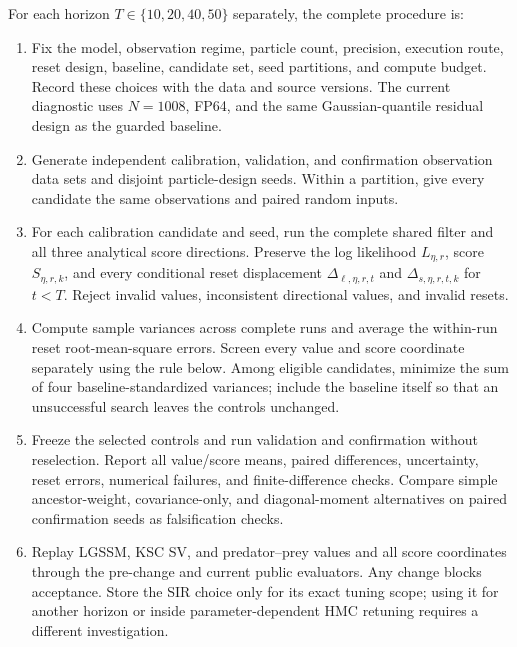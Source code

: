 For each horizon $T\in\{10,20,40,50\}$ separately, the complete procedure is:
\begin{enumerate}
 \item Fix the model, observation regime, particle count, precision, execution
 route, reset design, baseline, candidate set, seed partitions, and compute
 budget.  Record these choices with the data and source versions.  The current
 diagnostic uses $N=1008$, FP64, and the same Gaussian-quantile residual design
 as the guarded baseline.
 \item Generate independent calibration, validation, and confirmation
 observation data sets and disjoint particle-design seeds.  Within a partition,
 give every candidate the same observations and paired random inputs.
 \item For each calibration candidate and seed, run the complete shared
 filter and all three analytical score directions.  Preserve the log likelihood
 $L_{\eta,r}$, score $S_{\eta,r,k}$, and every conditional reset displacement
 $\Delta_{\ell,\eta,r,t}$ and $\Delta_{s,\eta,r,t,k}$ for $t<T$.
 Reject invalid values, inconsistent directional values, and invalid resets.
 \item Compute sample variances across complete runs and average the
 within-run reset root-mean-square errors.  Screen every value and score
 coordinate separately using the rule below.  Among eligible candidates,
 minimize the sum of four baseline-standardized variances; include the
 baseline itself so that an unsuccessful search leaves the controls unchanged.
 \item Freeze the selected controls and run validation and confirmation
 without reselection.  Report all value/score means, paired differences,
 uncertainty, reset errors, numerical failures, and finite-difference checks.
 Compare simple ancestor-weight, covariance-only, and diagonal-moment
 alternatives on paired confirmation seeds as falsification checks.
 \item Replay LGSSM, KSC SV, and predator--prey values and all score coordinates
 through the pre-change and current public evaluators.  Any change blocks
 acceptance.  Store the SIR choice only for its exact tuning scope; using it
 for another horizon or inside parameter-dependent HMC retuning requires a
 different investigation.
\end{enumerate}


